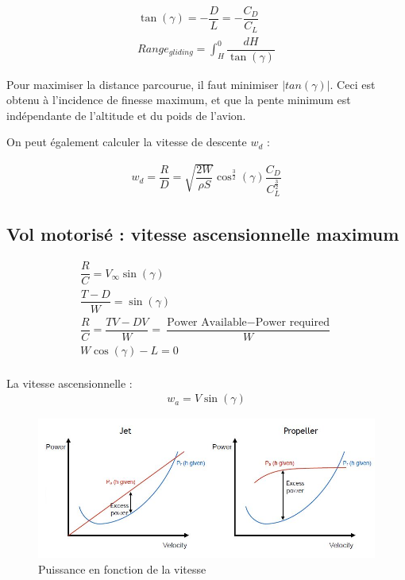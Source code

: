 \documentclass{report}
\begin{document}
\begin{eqnarray}
\tan(\gamma) = -\dfrac{D}{L}=-\dfrac{C_D}{C_L}\\
Range_{gliding}=\int_H^0\dfrac{dH}{\tan(\gamma)}
\end{eqnarray}

Pour maximiser la distance parcourue, il faut minimiser $|tan(\gamma)|$. Ceci est obtenu à l'incidence de finesse maximum, et que la pente minimum est indépendante de l'altitude et du poids de l'avion.

On peut également calculer la vitesse de descente $w_d$ :

\begin{eqnarray}
w_d=\dfrac{R}{D}=\sqrt{\dfrac{2W}{\rho S}}\cos^{\frac{3}{2}}(\gamma)\dfrac{C_D}{C_L^{\frac{3}{2}}}
\end{eqnarray}

\subsection{Vol motorisé : vitesse ascensionnelle maximum}

\begin{eqnarray}
\dfrac{R}{C}=V_\infty \sin(\gamma)\\
\dfrac{T-D}{W}=\sin(\gamma)\\
\dfrac{R}{C}=\dfrac{TV-DV}{W}=\dfrac{\text{Power Available}-\text{Power required}}{W}\\
W \cos(\gamma)-L=0\\
\end{eqnarray}

La vitesse ascensionnelle :
\begin{eqnarray}
w_a=V \sin(\gamma)
\end{eqnarray}

\begin{figure}[h!]
    \centering
    \includegraphics[scale=0.7]{13.JPG}
    \caption{Puissance en fonction de la vitesse}
    \label{13}
\end{figure}
\end{document}
